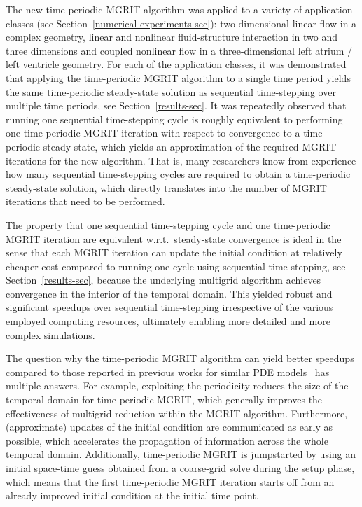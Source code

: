 \documentclass[3p]{elsarticle}
\begin{document}
The new time-periodic MGRIT algorithm was applied to a variety of application classes
(see Section~\ref{numerical-experiments-sec}):
two-dimensional linear flow in a complex geometry,
linear and nonlinear fluid-structure interaction in two and three dimensions
and coupled nonlinear flow in a three-dimensional left atrium / left ventricle geometry.
For each of the application classes,
it was demonstrated that applying the time-periodic MGRIT algorithm to a single time period
yields the same time-periodic steady-state solution
as sequential time-stepping over multiple time periods, see Section~\ref{results-sec}.
It was repeatedly observed that running one sequential time-stepping cycle
is roughly equivalent to performing one time-periodic MGRIT iteration
with respect to convergence to a time-periodic steady-state,
which yields an approximation
of the required MGRIT iterations for the new algorithm.
That is, many researchers know from experience how many sequential time-stepping cycles
are required to obtain a time-periodic steady-state solution,
which directly translates into the number of MGRIT iterations that need to be performed.

The property that one sequential time-stepping cycle and one time-periodic MGRIT iteration
are equivalent w.r.t.\ steady-state convergence is ideal
in the sense that each MGRIT iteration can update the initial condition
at relatively cheaper cost compared to running one cycle using sequential time-stepping,
see Section~\ref{results-sec},
because the underlying multigrid algorithm achieves convergence in the interior of the temporal domain.
This yielded robust and significant speedups over sequential time-stepping
irrespective of the various employed computing resources,
ultimately enabling more detailed and more complex simulations.

The question why the time-periodic MGRIT algorithm can yield better speedups
compared to those reported in previous works
for similar PDE models~\cite{FalgoutKatzKolevSchroderWissinkYang2015,
HessenthalerNordslettenRoehrleSchroderFalgout2018}
has multiple answers.
For example, exploiting the periodicity reduces the size of the temporal domain
for time-periodic MGRIT, which generally improves the effectiveness of multigrid reduction
within the MGRIT algorithm.
Furthermore, (approximate) updates of the initial condition are communicated as early as possible,
which accelerates the propagation of information across the whole temporal domain.
Additionally, time-periodic MGRIT is jumpstarted by using an initial space-time guess
obtained from a coarse-grid solve during the setup phase,
which means that the first time-periodic MGRIT iteration
starts off from an already improved initial condition at the initial time point.
\end{document}
